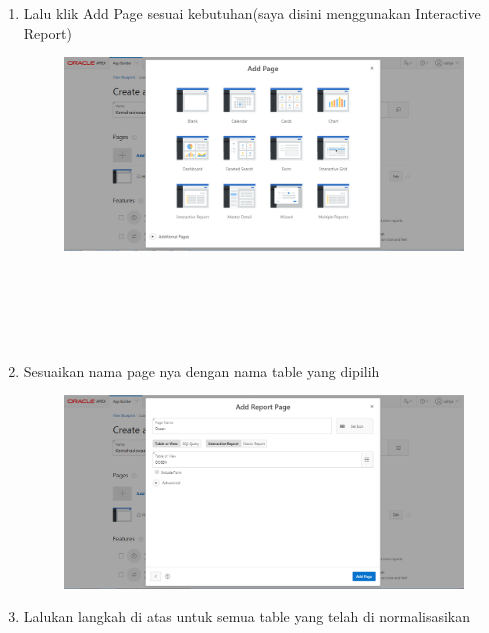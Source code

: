 \documentclass[12pt, times new roman, a4paper]{article}
\begin{document}
\begin{enumerate}
\item Lalu klik Add Page sesuai kebutuhan(saya disini menggunakan Interactive Report)
\begin{figure} [h]
	\centering
		\includegraphics[scale=0.4]{gambar/16}
\end{figure}
\\
\\
\\
\\
\item Sesuaikan nama page nya dengan nama table yang dipilih
\begin{figure} [h]
	\centering
		\includegraphics[scale=0.4]{gambar/17}
\end{figure}

\item Lalukan langkah di atas untuk semua table yang telah di normalisasikan


\end{enumerate}
\end{document}
